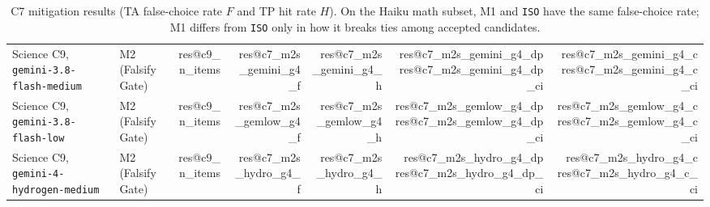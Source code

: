 \documentclass[10pt,twocolumn]{article}
\makeatletter
\newcommand{\res}[1]{\csname res@#1\endcsname}
\makeatother
\begin{document}
\begin{table}[t]
{\begin{tabular}{llrrrrr}
Science C9, \texttt{gemini-3.8-flash-medium} & M2 (Falsify Gate) & \res{c9_n_items} & \res{c7_m2s_gemini_g4_f} & \res{c7_m2s_gemini_g4_h} & \res{c7_m2s_gemini_g4_dp} \res{c7_m2s_gemini_g4_dp_ci} & \res{c7_m2s_gemini_g4_c} \res{c7_m2s_gemini_g4_c_ci} \\
Science C9, \texttt{gemini-3.8-flash-low} & M2 (Falsify Gate) & \res{c9_n_items} & \res{c7_m2s_gemlow_g4_f} & \res{c7_m2s_gemlow_g4_h} & \res{c7_m2s_gemlow_g4_dp} \res{c7_m2s_gemlow_g4_dp_ci} & \res{c7_m2s_gemlow_g4_c} \res{c7_m2s_gemlow_g4_c_ci} \\
Science C9, \texttt{gemini-4-hydrogen-medium} & M2 (Falsify Gate) & \res{c9_n_items} & \res{c7_m2s_hydro_g4_f} & \res{c7_m2s_hydro_g4_h} & \res{c7_m2s_hydro_g4_dp} \res{c7_m2s_hydro_g4_dp_ci} & \res{c7_m2s_hydro_g4_c} \res{c7_m2s_hydro_g4_c_ci} \\
\bottomrule
\end{tabular}%
}
\caption{C7 mitigation results (TA false-choice rate $F$ and TP hit rate $H$). On the Haiku math subset, M1 and \texttt{ISO} have the same false-choice rate; M1 differs from \texttt{ISO} only in how it breaks ties among accepted candidates.}
\label{tab:mitigation}
\end{table}
\end{document}
